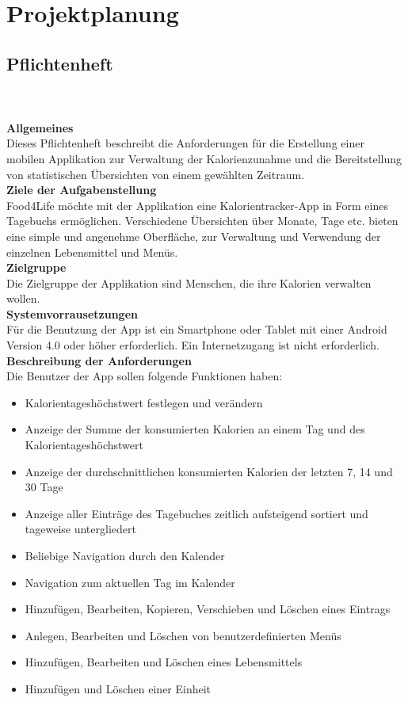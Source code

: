 \section{Projektplanung}
\label{concept}

\subsection{Pflichtenheft}\\
\\
\textbf{Allgemeines}
\\Dieses Pflichtenheft beschreibt die Anforderungen für die Erstellung einer mobilen Applikation zur Verwaltung der Kalorienzunahme und die Bereitstellung von statistischen Übersichten von einem gewählten Zeitraum.\\
\textbf{Ziele der Aufgabenstellung}\\
Food4Life möchte mit der Applikation eine Kalorientracker-App in Form eines Tagebuchs ermöglichen. Verschiedene Übersichten über Monate, Tage etc. bieten eine simple und angenehme Oberfläche, zur Verwaltung und Verwendung der einzelnen Lebensmittel und Menüs.\\
\textbf{Zielgruppe}\\
Die Zielgruppe der Applikation sind Menschen, die ihre Kalorien verwalten wollen.\\
\textbf{Systemvorrausetzungen}\\
Für die Benutzung der App ist ein Smartphone oder Tablet mit einer Android Version 4.0 oder höher erforderlich. Ein Internetzugang ist nicht erforderlich.\\
\textbf{Beschreibung der Anforderungen}\\
Die Benutzer der App sollen folgende Funktionen haben:
\begin{itemize}
\item Kalorientageshöchstwert festlegen und verändern
\item 	Anzeige der Summe der konsumierten Kalorien an einem Tag und des Kalorientageshöchstwert
\item 	Anzeige der durchschnittlichen konsumierten Kalorien der letzten 7, 14 und 30 Tage
\item 	Anzeige aller Einträge des Tagebuches zeitlich aufsteigend sortiert und tageweise untergliedert
\item 	Beliebige Navigation durch den Kalender
\item 	Navigation zum aktuellen Tag im Kalender
\item 	Hinzufügen, Bearbeiten, Kopieren, Verschieben und Löschen eines Eintrags
\item 	Anlegen, Bearbeiten und Löschen von benutzerdefinierten Menüs
\item 	Hinzufügen, Bearbeiten und Löschen eines Lebensmittels
\item 	Hinzufügen und Löschen einer Einheit\\
\end{itemize}


